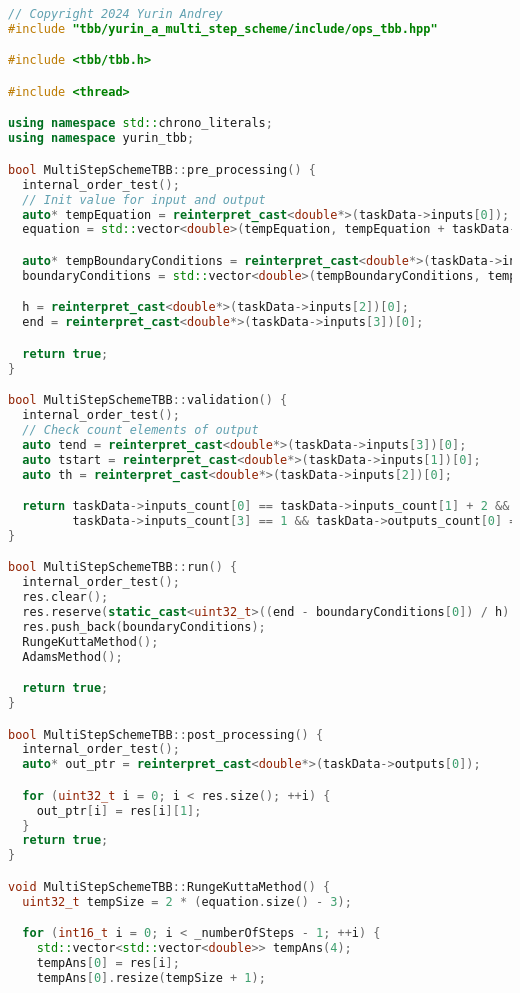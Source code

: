 \documentclass{report}
\begin{document}
\begin{lstlisting}[language=C++,caption=TBB версия]
// Copyright 2024 Yurin Andrey
#include "tbb/yurin_a_multi_step_scheme/include/ops_tbb.hpp"

#include <tbb/tbb.h>

#include <thread>

using namespace std::chrono_literals;
using namespace yurin_tbb;

bool MultiStepSchemeTBB::pre_processing() {
  internal_order_test();
  // Init value for input and output
  auto* tempEquation = reinterpret_cast<double*>(taskData->inputs[0]);
  equation = std::vector<double>(tempEquation, tempEquation + taskData->inputs_count[0]);

  auto* tempBoundaryConditions = reinterpret_cast<double*>(taskData->inputs[1]);
  boundaryConditions = std::vector<double>(tempBoundaryConditions, tempBoundaryConditions + taskData->inputs_count[1]);

  h = reinterpret_cast<double*>(taskData->inputs[2])[0];
  end = reinterpret_cast<double*>(taskData->inputs[3])[0];

  return true;
}

bool MultiStepSchemeTBB::validation() {
  internal_order_test();
  // Check count elements of output
  auto tend = reinterpret_cast<double*>(taskData->inputs[3])[0];
  auto tstart = reinterpret_cast<double*>(taskData->inputs[1])[0];
  auto th = reinterpret_cast<double*>(taskData->inputs[2])[0];

  return taskData->inputs_count[0] == taskData->inputs_count[1] + 2 && taskData->inputs_count[2] == 1 &&
         taskData->inputs_count[3] == 1 && taskData->outputs_count[0] == (tend - tstart) / th + 1;
}

bool MultiStepSchemeTBB::run() {
  internal_order_test();
  res.clear();
  res.reserve(static_cast<uint32_t>((end - boundaryConditions[0]) / h) + 2);
  res.push_back(boundaryConditions);
  RungeKuttaMethod();
  AdamsMethod();

  return true;
}

bool MultiStepSchemeTBB::post_processing() {
  internal_order_test();
  auto* out_ptr = reinterpret_cast<double*>(taskData->outputs[0]);

  for (uint32_t i = 0; i < res.size(); ++i) {
    out_ptr[i] = res[i][1];
  }
  return true;
}

void MultiStepSchemeTBB::RungeKuttaMethod() {
  uint32_t tempSize = 2 * (equation.size() - 3);

  for (int16_t i = 0; i < _numberOfSteps - 1; ++i) {
    std::vector<std::vector<double>> tempAns(4);
    tempAns[0] = res[i];
    tempAns[0].resize(tempSize + 1);


\end{lstlisting}
\end{document}

